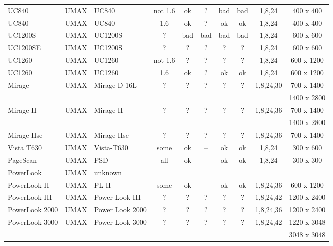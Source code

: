 \begin{tabular}{|l|l|l|c|c|c|c|c|c|c|}
UC840              &UMAX     &UC840           &not 1.6 &ok  &?   &bad &bad   &1,8,24    &  400 x  400\\
UC840              &UMAX     &UC840           &1.6     &ok  &?   &ok  &ok    &1,8,24    &  400 x  400\\
UC1200S            &UMAX     &UC1200S         &?       &bad &bad &bad &bad   &1,8,24    &  600 x  600\\
UC1200SE           &UMAX     &UC1200S         &?       &?   &?   &?   &?     &1,8,24    &  600 x  600\\
UC1260             &UMAX     &UC1260          &not 1.6 &?   &?   &?   &?     &1,8,24    &  600 x 1200\\
UC1260             &UMAX     &UC1260          &1.6     &ok  &?   &ok  &ok    &1,8,24    &  600 x 1200\\
Mirage             &UMAX     &Mirage D-16L    &?       &?   &?   &?   &?     &1,8,24,30 &  700 x 1400\\
                   &         &                &        &    &    &    &      &          & 1400 x 2800\\
Mirage II          &UMAX     &Mirage II       &?       &?   &?   &?   &?     &1,8,24,36 &  700 x 1400\\
                   &         &                &        &    &    &    &      &          & 1400 x 2800\\
Mirage IIse        &UMAX     &Mirage IIse     &?       &?   &?   &?   &?     &1,8,24,36 &  700 x 1400\\
Vista T630         &UMAX     &Vista-T630      &some    &ok  &--  &ok  &ok    &1,8,24    &  300 x  600\\
PageScan           &UMAX     &PSD             &all     &ok  &--  &ok  &ok    &1,8,24    &  300 x  300\\
PowerLook          &UMAX     &unknown         &        &    &    &    &      &          &\\
PowerLook II       &UMAX     &PL-II           &some    &ok  &--  &ok  &ok    &1,8,24,36 &  600 x 1200\\
PowerLook III      &UMAX     &Power Look III  &?       &?   &?   &?   &?     &1,8,24,42 & 1200 x 2400\\
PowerLook 2000     &UMAX     &Power Look 2000 &?       &?   &?   &?   &?     &1,8,24,36 & 1200 x 2400\\
PowerLook 3000     &UMAX     &Power Look 3000 &?       &?   &?   &?   &?     &1,8,24,42 & 1220 x 3048\\
                   &         &                &        &    &    &    &      &          & 3048 x 3048\\

\end{tabular}
